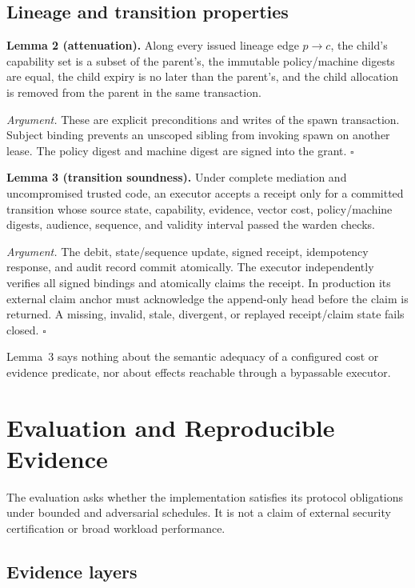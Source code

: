 \documentclass[10pt]{article}
\begin{document}
\subsection{Lineage and transition properties}

\textbf{Lemma 2 (attenuation).} Along every issued lineage edge $p\rightarrow c$, the child's
capability set is a subset of the parent's, the immutable policy/machine digests are equal, the
child expiry is no later than the parent's, and the child allocation is removed from the parent in
the same transaction.

\textit{Argument.} These are explicit preconditions and writes of the spawn transaction. Subject
binding prevents an unscoped sibling from invoking spawn on another lease. The policy digest and
machine digest are signed into the grant. \hfill$\square$

\textbf{Lemma 3 (transition soundness).} Under complete mediation and uncompromised trusted code,
an executor accepts a receipt only for a committed transition whose source state, capability,
evidence, vector cost, policy/machine digests, audience, sequence, and validity interval passed the
warden checks.

\textit{Argument.} The debit, state/sequence update, signed receipt, idempotency response, and audit
record commit atomically. The executor independently verifies all signed bindings and atomically
claims the receipt. In production its external claim anchor must acknowledge the append-only head
before the claim is returned. A missing, invalid, stale, divergent, or replayed receipt/claim state
fails closed. \hfill$\square$

Lemma~3 says nothing about the semantic adequacy of a configured cost or evidence predicate, nor
about effects reachable through a bypassable executor.

\section{Evaluation and Reproducible Evidence}
\label{sec:evaluation}

The evaluation asks whether the implementation satisfies its protocol obligations under bounded
and adversarial schedules. It is not a claim of external security certification or broad workload
performance.

\subsection{Evidence layers}
\end{document}
